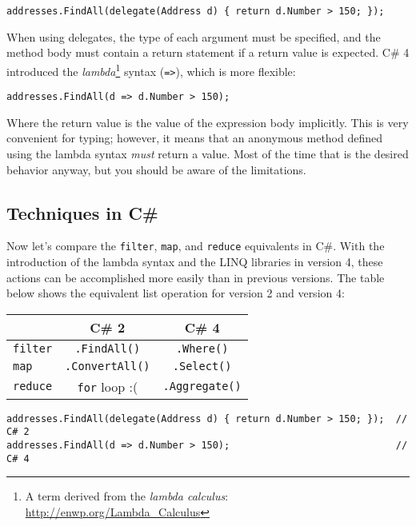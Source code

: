 \documentclass{article}\usepackage{beamerarticle}
\begin{document}
\begin{lstlisting}[style=csharp,caption={Delegate Syntax},label={lst:delegate}]
addresses.FindAll(delegate(Address d) { return d.Number > 150; });
\end{lstlisting}

When using delegates, the type of each argument must be specified, and the method body must contain a return statement if a return value is expected. C\# 4 introduced the \textit{lambda}\footnote{A term derived from the \textit{lambda calculus}: \url{http://enwp.org/Lambda_Calculus}} syntax (\texttt{=>}), which is more flexible:

\begin{lstlisting}[style=csharp,caption={Delegate Syntax},label={lst:lambda}]
addresses.FindAll(d => d.Number > 150);
\end{lstlisting}

Where the return value is the value of the expression body implicitly. This is very convenient for typing; however, it means that an anonymous method defined using the lambda syntax \textit{must} return a value. Most of the time that is the desired behavior anyway, but you should be aware of the limitations.

\subsection{Techniques in C\#}
Now let's compare the \texttt{filter}, \texttt{map}, and \texttt{reduce} equivalents in C\#. With the introduction of the lambda syntax and the LINQ libraries in version 4, these actions can be accomplished more easily than in previous versions. The table below shows the equivalent list operation for version 2 and version 4:

\begin{frame}
\begin{center}
\begin{tabular}{l|c|c}
 & C\# 2 & C\# 4 \\
\hline
\texttt{filter} & \texttt{.FindAll()} & \texttt{.Where()} \\
\texttt{map} & \texttt{.ConvertAll()} & \texttt{.Select()} \\
\texttt{reduce} & \texttt{for} loop :( & \texttt{.Aggregate()}
\end{tabular}
\end{center}
\end{frame}

\begin{lstlisting}[style=csharp,caption={Filter in C\#},label={lst:csharp_filter}]
addresses.FindAll(delegate(Address d) { return d.Number > 150; });  // C# 2
addresses.FindAll(d => d.Number > 150);                             // C# 4
\end{lstlisting}
\end{document}
